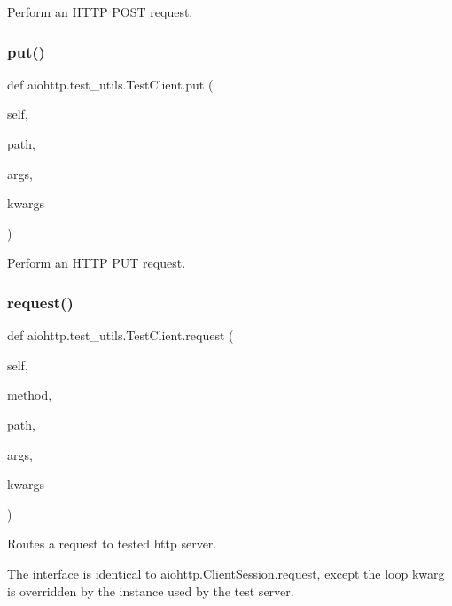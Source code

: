 \begin{DoxyVerb}Perform an HTTP POST request.\end{DoxyVerb}
 \mbox{\label{classaiohttp_1_1test__utils_1_1_test_client_a4cbc6b61b7e81b0b9756b9001ac036a5}} 
\subsubsection{\texorpdfstring{put()}{put()}}
{\footnotesize\ttfamily def aiohttp.\+test\+\_\+utils.\+Test\+Client.\+put (\begin{DoxyParamCaption}\item[{}]{self,  }\item[{}]{path,  }\item[{}]{args,  }\item[{}]{kwargs }\end{DoxyParamCaption})}

\begin{DoxyVerb}Perform an HTTP PUT request.\end{DoxyVerb}
 \mbox{\label{classaiohttp_1_1test__utils_1_1_test_client_ad50152750e41be8b95477dc6b1676577}} 
\subsubsection{\texorpdfstring{request()}{request()}}
{\footnotesize\ttfamily def aiohttp.\+test\+\_\+utils.\+Test\+Client.\+request (\begin{DoxyParamCaption}\item[{}]{self,  }\item[{}]{method,  }\item[{}]{path,  }\item[{}]{args,  }\item[{}]{kwargs }\end{DoxyParamCaption})}

\begin{DoxyVerb}Routes a request to tested http server.

The interface is identical to aiohttp.ClientSession.request,
except the loop kwarg is overridden by the instance used by the
test server.\end{DoxyVerb}
 \mbox{\label{classaiohttp_1_1test__utils_1_1_test_client_a1221146af3042654408d2e7401bf83d8}} 
